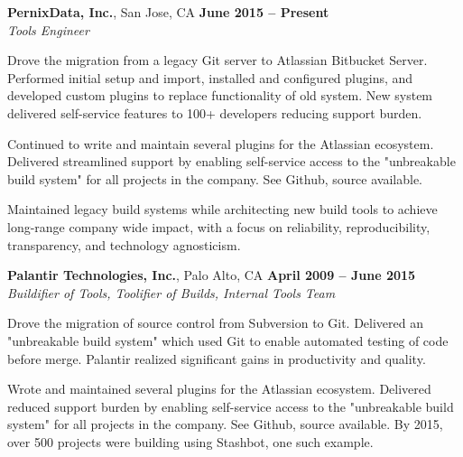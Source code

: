 \documentclass[margin,line]{resume}
\begin{document}
\begin{resume}
	{\bf PernixData, Inc.}, San Jose, CA   \hfill {\bf June 2015 -- Present}
	\vspace{1mm} \\ \vspace{1mm}
	{\sl Tools Engineer}
	\begin{list2}
		\vspace*{1mm}
	\item
        Drove the migration from a legacy Git server to Atlassian Bitbucket
        Server.  Performed initial setup and import, installed and configured
        plugins, and developed custom plugins to replace functionality of old
        system.  New system delivered self-service features to 100+ developers
        reducing support burden.
	\item
        Continued to write and maintain several plugins for the Atlassian
        ecosystem.  Delivered streamlined support by enabling self-service
        access to the "unbreakable build system" for all projects in the
        company.  See Github, source available.
        \item
        Maintained legacy build systems while architecting new build tools to
        achieve long-range company wide impact, with a focus on reliability,
        reproducibility, transparency, and technology agnosticism.
	\end{list2}
	{\bf Palantir Technologies, Inc.}, Palo Alto, CA   \hfill {\bf April 2009 -- June 2015}
	\vspace{1mm} \\ \vspace{1mm}
	{\sl Buildifier of Tools, Toolifier of Builds, Internal Tools Team} %
	\begin{list2}
		\vspace*{1mm}
	\item
		Drove the migration of source control from Subversion to Git.
		Delivered an "unbreakable build system" which used Git to enable
		automated testing of code before merge.  Palantir realized significant
		gains in productivity and quality.
	\item
		Wrote and maintained several plugins for the Atlassian ecosystem.
		Delivered reduced support burden by enabling self-service access to
		the "unbreakable build system" for all projects in the company.  See
                Github, source available.  By 2015, over 500 projects were
                building using Stashbot, one such example.
	\item

\end{list2}
\end{resume}
\end{document}
